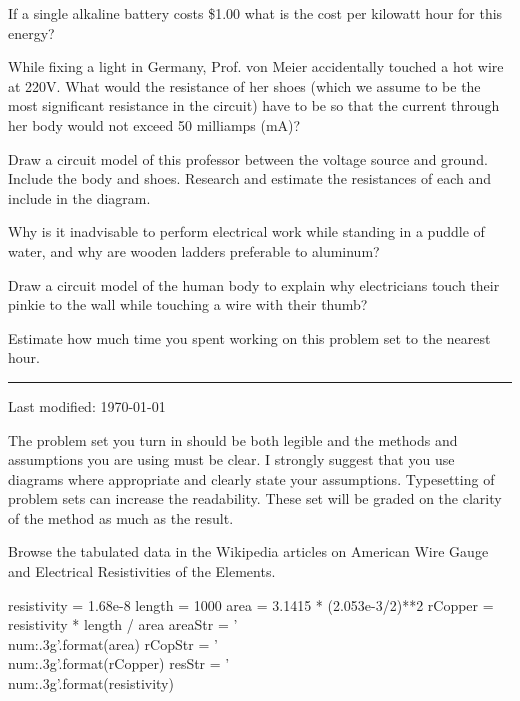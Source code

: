 \documentclass{article}
\begin{document}
\subproblem
If a single alkaline battery costs \$1.00 what is the cost per kilowatt
hour for this energy?



\subproblem
While fixing a light in Germany, Prof. von Meier accidentally
touched a hot wire at 220V.  What would the resistance of her shoes
(which we assume to be the most significant resistance in the
circuit) have to be so that the current through her body would not
exceed 50 milliamps (mA)?

\subproblem
Draw a circuit model of this professor between the voltage source and
ground.  Include the body and shoes.  Research and estimate the
resistances of each and include in the diagram.

\subproblem
Why is it inadvisable to perform electrical work while standing
in a puddle of water, and why are wooden ladders preferable to
aluminum?

\subproblem
Draw a circuit model of the human body to explain why electricians touch
their pinkie to the wall while touching a wire with their thumb?



Estimate how much time you spent working on this problem set to the
nearest hour.

\newpage
\setcounter{problem}{0}
\setcounter{page}{1}
\hrule
\vspace{10pt}

{\tiny Last modified: \today}

The problem set you turn in should be both legible and the methods and
assumptions you are using must be clear.  I strongly suggest that
you use diagrams where appropriate and clearly state your assumptions.
Typesetting of problem sets can increase the readability.  These set
will be graded on the clarity of the method as much as the result.



Browse the tabulated data in the Wikipedia articles on American Wire Gauge and
Electrical Resistivities of the Elements.


\begin{pycode}
resistivity = 1.68e-8
length = 1000
area = 3.1415 * (2.053e-3/2)**2
rCopper = resistivity * length / area
areaStr = '\\num{{{:.3g}}}'.format(area)
rCopStr = '\\num{{{:.3g}}}'.format(rCopper)
resStr = '\\num{{{:.3g}}}'.format(resistivity)
\end{pycode}
\end{document}

